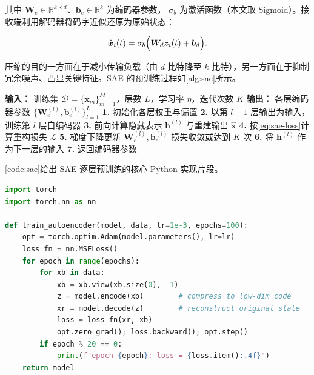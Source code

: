 其中 $\boldsymbol{W}_{e}\in\mathbb{R}^{k\times d}$、$\boldsymbol{b}_{e}\in\mathbb{R}^{k}$ 为编码器参数，
$\sigma_b$ 为激活函数（本文取 Sigmoid）。接收端利用解码器将码字近似还原为原始状态：

\begin{equation}\label{eq:reconstruct}
  \hat{\boldsymbol{x}}_i(t) =
  \sigma_b\Bigl(\boldsymbol{W}_{d}\boldsymbol{z}_i(t) + \boldsymbol{b}_{d}\Bigr).
\end{equation}

压缩的目的一方面在于减小传输负载（由 $d$ 比特降至 $k$ 比特），另一方面在于抑制冗余噪声、凸显关键特征。SAE
的预训练过程如\cref{alg:sae}所示。

\begin{algorithm}[htb]
  \caption{堆叠自编码器逐层预训练}\label{alg:sae}
  \begin{algorithmic}
    \STATE \textbf{输入：} 训练集 $\mathcal{D}=\{\boldsymbol{x}_m\}_{m=1}^{M}$，层数 $L$，学习率 $\eta$，迭代次数 $K$
    \STATE \textbf{输出：} 各层编码器参数 $\{\boldsymbol{W}_e^{(l)},\boldsymbol{b}_e^{(l)}\}_{l=1}^{L}$
    \alginputrule
    \STATE \textbf{1.} 初始化各层权重与偏置
      \STATE \textbf{2.} 以第 $l-1$ 层输出为输入，训练第 $l$ 层自编码器
      \REPEAT
        \STATE \textbf{3.} 前向计算隐藏表示 $\boldsymbol{h}^{(l)}$ 与重建输出 $\hat{\boldsymbol{x}}$
        \STATE \textbf{4.} 按\cref{eq:sae-loss}计算重构损失 $\mathcal{L}$
        \STATE \textbf{5.} 梯度下降更新 $\boldsymbol{W}_e^{(l)},\boldsymbol{b}_e^{(l)}$
      \UNTIL 损失收敛或达到 $K$ 次
      \STATE \textbf{6.} 将 $\boldsymbol{h}^{(l)}$ 作为下一层的输入
    \ENDFOR
    \STATE \textbf{7.} 返回编码器参数
  \end{algorithmic}
\end{algorithm}

\cref{code:sae}给出 SAE 逐层预训练的核心 Python 实现片段。

\begin{code}[htbp]
  \begin{lstlisting}[language=Python]
import torch
import torch.nn as nn

def train_autoencoder(model, data, lr=1e-3, epochs=100):
    opt = torch.optim.Adam(model.parameters(), lr=lr)
    loss_fn = nn.MSELoss()
    for epoch in range(epochs):
        for xb in data:
            xb = xb.view(xb.size(0), -1)
            z = model.encode(xb)        # compress to low-dim code
            xr = model.decode(z)        # reconstruct original state
            loss = loss_fn(xr, xb)
            opt.zero_grad(); loss.backward(); opt.step()
        if epoch % 20 == 0:
            print(f"epoch {epoch}: loss = {loss.item():.4f}")
    return model
  \end{lstlisting}
  \caption{SAE 逐层预训练实现（PyTorch）}\label{code:sae}
\end{code}

